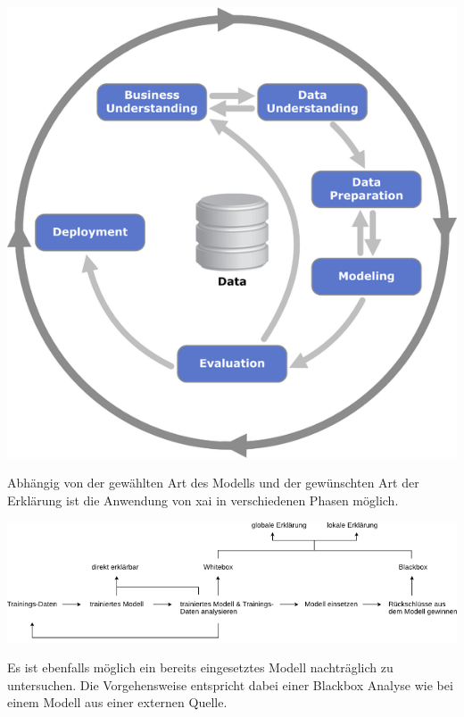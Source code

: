 \documentclass[
  12pt, %
  a4paper, %
  oneside, %
  openany, 
  numbers=noenddot, %
  BCOR=5mm, %
  parskip=half*, %
  thesis, %
]{bfhbook}
\begin{document}
\begin{center}
\begin{minipage}[t]{0.8\linewidth}
	\includegraphics[width=\textwidth]{Bilder/CRISP-DM-Process-Diagram.png}
\end{minipage}
\end{center}
\clearpage
Abhängig von der gewählten Art des Modells und der gewünschten Art der Erklärung ist die Anwendung von \Gls{xai} in verschiedenen Phasen möglich.
\begin{center}
\begin{minipage}[t]{\linewidth}
	\includegraphics[width=\textwidth]{Bilder/XAI-Process.png}
\end{minipage}
\end{center}
Es ist ebenfalls möglich ein bereits eingesetztes Modell nachträglich zu untersuchen. Die Vorgehensweise entspricht dabei einer \Gls{Blackbox} Analyse wie bei einem Modell aus einer externen Quelle. 
\end{document}
